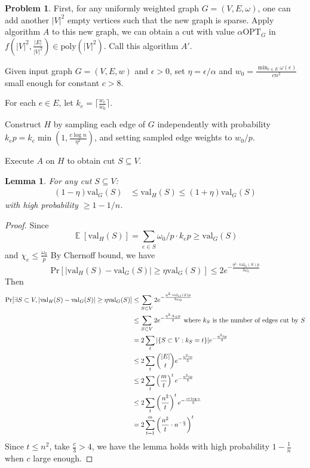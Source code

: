 \documentclass[a4paper]{article}
\theoremstyle{definition}
\newtheorem{problem}{Problem}
\theoremstyle{plain}
\newtheorem{lemma}[definition]{Lemma}
\newcommand{\Ebb}{\mathop\mathbb E}
\newcommand{\<}{\left<}
\renewcommand{\>}{\right>}
\newcommand{\OPT}{\mathrm{OPT}}
\numberwithin{equation}{problem}
\begin{document}
\begin{problem}
  First, for any uniformly weighted graph  $ G=(V,E,\omega) $, one can add another  $ |V|^2 $  empty vertices such that the new graph is sparse. Apply algorithm  $ A $ to this new graph, we can obtain a cut with value  $ \alpha\OPT_G $ in  $ f(|V|^2,\frac{|E|}{|V|^2})\in\mathrm{poly}(|V|^2) $. Call this algorithm  $ A' $.

  Given input graph $G=(V,E,w)$ and $\epsilon > 0$,    set $\eta = \epsilon/\alpha$ and $w_0=\frac{\min_{e\in E}\omega(e)}{cn^2} $ small enough for constant $c > 8$.

  For each  $ e\in E $, let  $ k_e=\lceil \frac{w_e}{w_0} \rceil $. 

    Construct $H$ by sampling each edge of $G$ independently with probability $k_ep = k_e\min(1, \frac{c \log n}{\eta^2})$, and setting sampled edge weights to $w_0/p$.

    Execute $A$ on $H$ to obtain cut $S \subseteq V$.

\begin{lemma}
For any cut $S \subseteq V$:
\begin{align*}
(1-\eta)\text{val}_{G}(S) &\leq \text{val}_H(S) \leq (1+\eta)\text{val}_{G}(S)
\end{align*}
with high probability $\geq 1-1/n$.
\end{lemma}
\newcommand{\val}{\mathrm{val}}
\begin{proof}
  Since 
  \[\Ebb[\mathrm{val}_H(S)]=\sum_{e\in S}\omega_0/p\cdot k_e p \geq \mathrm{val}_G(S)\]
  and  $ \chi_e \leq \frac{\omega_0}{p} $ 
  By Chernoff bound, we have
  \[\mathrm{Pr}[|\text{val}_H(S)-\mathrm{val}_G(S)| \geq \eta\mathrm{val}_G(S)] \leq 2e^{-\frac{\eta^2\cdot\val_G(S)p}{3\omega_0}}\]
  Then 
  \[\begin{aligned}
    \mathrm{Pr}[\exists S\subset V,|\text{val}_H(S)-\mathrm{val}_G(S)| \geq \eta\mathrm{val}_G(S)] &\leq \sum_{S\subset V}2e^{-\frac{\eta^2\cdot\val_G(S)p}{3\omega_0}}\\
    &  \leq \sum_{S\subset V}2e^{-\frac{\eta^2\cdot k_Sp}{3}}\text{ where  $ k_S $ is the number of edges cut by  $ S $}\\
    &=2\sum_{t}|\{S\subset V:k_S=t\}|e^{-\frac{\eta^2 t p}{3}}\\
    & \leq 2\sum_t\binom{|E|}{t}e^{-\frac{\eta^2 t p}{3}}\\
    & \leq 2\sum_t\left(\frac{m}{t}\right)^te^{-\frac{\eta^2 t p}{3}}\\
    & \leq 2\sum_t\left(\frac{n^2}{t}\right)^te^{-\frac{ct\log n}{3}}\\
    &=2\sum_{t=1}^m\left(\frac{n^2}{t}\cdot n^{-\frac{c}{3}}\right)^t
  \end{aligned}\]
Since  $ t \leq n^2 $, take  $ \frac{c}{3}>4 $, we have the lemma holds with high probability $ 1-\frac{1}{n} $  when  $ c $ large enough.






\end{proof}
\end{problem}
\end{document}
